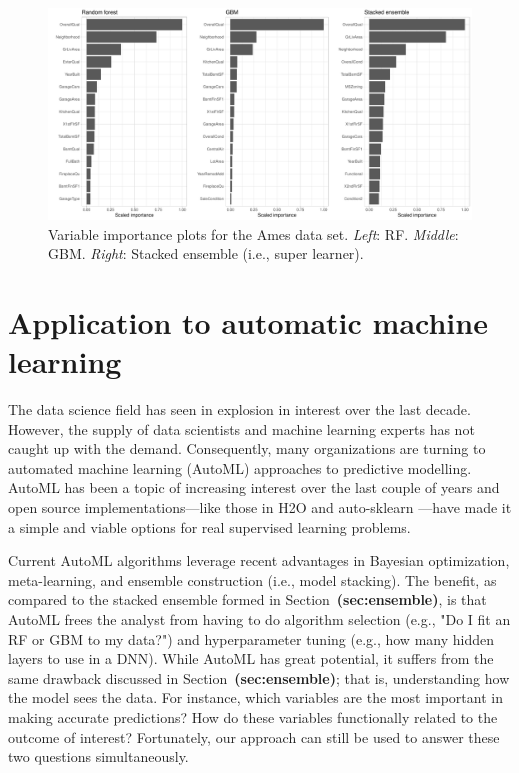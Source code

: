 \documentclass[12pt]{article}
\def\ref#1{\textbf{(#1)}}
\begin{document}
\begin{figure}[!htb]
  \centering
  \includegraphics[width=1.0\textwidth]{ames-ensemble-vip}
  \caption{Variable importance plots for the Ames data set. \textit{Left}: RF. \textit{Middle}: GBM. \textit{Right}: Stacked ensemble (i.e., super learner). \label{fig:ames-ensemble-vip}}
\end{figure}


\section{Application to automatic machine learning}
\label{sec:automl}

The data science field has seen in explosion in interest over the last decade. However, the supply of data scientists and machine learning experts has not caught up with the demand. Consequently, many organizations are turning to automated machine learning (AutoML) approaches to predictive modelling. AutoML has been a topic of increasing interest over the last couple of years and open source implementations---like those in H2O and auto-sklearn \citep{auto-sklearn}---have made it a simple and viable options for real supervised learning problems.

Current AutoML algorithms leverage recent advantages in Bayesian optimization, meta-learning, and ensemble construction (i.e., model stacking). The benefit, as compared to the stacked ensemble formed in Section~\ref{sec:ensemble}, is that AutoML frees the analyst from having to do algorithm selection (e.g., "Do I fit an RF or GBM to my data?") and hyperparameter tuning (e.g., how many hidden layers to use in a DNN). While AutoML has great potential, it suffers from the same drawback discussed in Section~\ref{sec:ensemble}; that is, understanding how the model sees the data. For instance, which variables are the most important in making accurate predictions? How do these variables functionally related to the outcome of interest? Fortunately, our approach can still be used to answer these two questions simultaneously.
\end{document}
